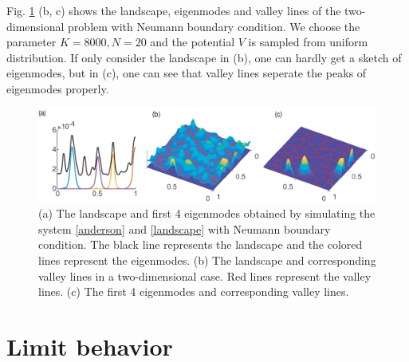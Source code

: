 \documentclass[a4paper,11pt]{article}
\begin{document}
Fig. \ref{fig1} (b, c) shows the landscape, eigenmodes and valley lines of the two-dimensional problem with Neumann boundary condition. We choose the parameter $K = 8000, N = 20$ and the potential $V$ is sampled from uniform distribution. If only consider the landscape in (b), one can hardly get a sketch of eigenmodes, but in (c), one can see that valley lines seperate the peaks of eigenmodes properly.

\begin{figure}
\centering
\includegraphics[width=\linewidth]{Fig1.eps}
\caption{(a) The landscape and first 4 eigenmodes obtained by simulating the system \eqref{anderson} and \eqref{landscape} with Neumann boundary condition. The black line represents the landscape and the colored lines represent the eigenmodes. (b) The landscape and corresponding valley lines in a two-dimensional case. Red lines represent the valley lines. (c) The first 4 eigenmodes and corresponding valley lines.}
\label{fig1}
\end{figure}

%
%
%

\section{Limit behavior}\label{limit}
\end{document}

